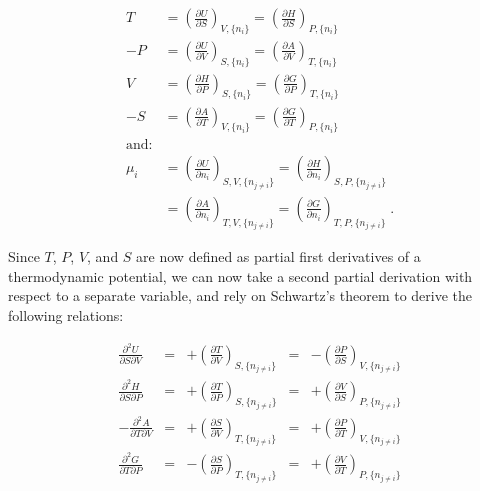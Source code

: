 \documentclass[
  9pt,
]{extbook}
\theoremstyle{definition}
\theoremstyle{definition}
\theoremstyle{definition}
\theoremstyle{remark}
\begin{document}
\begin{equation}
\begin{aligned}
 T &= \left(\frac{\partial U}{\partial S} \right)_{V,\{n_i\}} = \left(\frac{\partial H}{\partial S} \right)_{P,\{n_i\}}  \\
-P &= \left(\frac{\partial U}{\partial V} \right)_{S,\{n_i\}} = \left(\frac{\partial A}{\partial V} \right)_{T,\{n_i\}}  \\
 V &= \left(\frac{\partial H}{\partial P} \right)_{S,\{n_i\}} = \left(\frac{\partial G}{\partial P} \right)_{T,\{n_i\}}  \\
-S &= \left(\frac{\partial A}{\partial T} \right)_{V,\{n_i\}} = \left(\frac{\partial G}{\partial T} \right)_{P,\{n_i\}}  \\
\text{and:}
\\
 \mu_i &=  \left(\frac{\partial U}{\partial n_i} \right)_{S,V,\{n_{j \neq i}\}} =  \left(\frac{\partial H}{\partial n_i} \right)_{S,P,\{n_{j \neq i}\}} \\
       &= \left(\frac{\partial A}{\partial n_i} \right)_{T,V,\{n_{j \neq i}\}} = \left(\frac{\partial G}{\partial n_i} \right)_{T,P,\{n_{j \neq i}\}}\;.
\end{aligned}
\label{eq:dhagchem3}
\end{equation}

Since \(T\), \(P\), \(V\), and \(S\) are now defined as partial first derivatives of a thermodynamic potential, we can now take a second partial derivation with respect to a separate variable, and rely on Schwartz's theorem to derive the following relations:

\begin{equation}
\begin{aligned}
\frac{\partial^2 U }{\partial S \partial V} &=& +\left(\frac{\partial T}{\partial V}\right)_{S,\{n_{j \neq i}\}} &=& -\left(\frac{\partial P}{\partial S}\right)_{V,\{n_{j \neq i}\}}   \\
\frac{\partial^2 H }{\partial S \partial P} &=& +\left(\frac{\partial T}{\partial P}\right)_{S,\{n_{j \neq i}\}} &=& +\left(\frac{\partial V}{\partial S}\right)_{P,\{n_{j \neq i}\}}  \\
-\frac{\partial^2 A }{\partial T \partial V} &=& +\left(\frac{\partial S}{\partial V}\right)_{T,\{n_{j \neq i}\}} &=& +\left(\frac{\partial P}{\partial T}\right)_{V,\{n_{j \neq i}\}}  \\
\frac{\partial^2 G }{\partial T \partial P} &=& -\left(\frac{\partial S}{\partial P}\right)_{T,\{n_{j \neq i}\}} &=& +\left(\frac{\partial V}{\partial T}\right)_{P,\{n_{j \neq i}\}}
\end{aligned}
\label{eq:maxrelf}
\end{equation}
\end{document}
